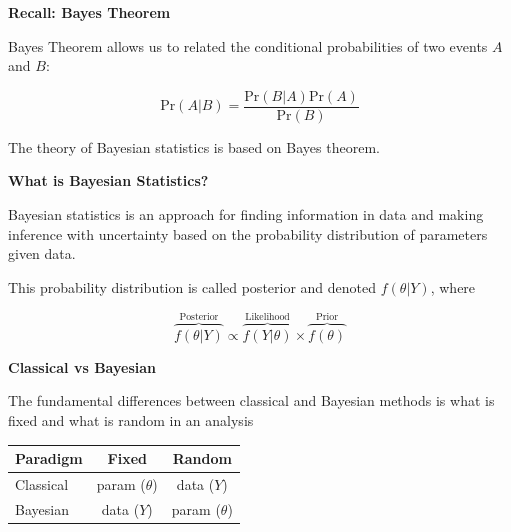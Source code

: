 \documentclass[12pt,xcolor=svgnames]{beamer}
\newcommand{\bl}{\color{blue}}
\newcommand{\theme}{\color{FireBrick}}
\newcommand{\sk}{\vspace{.4cm}}
\newcommand{\chap}[1]{{\theme \Large \bf #1} \sk}
\newcommand{\pr}{\text{Pr}}
\begin{document}

\begin{frame}
\chap{Recall: Bayes Theorem} 

Bayes Theorem allows us to related the conditional probabilities of two events $A$ and $B$:

\begin{equation*}
\pr(A|B) = \frac{\pr(B|A)\pr(A)}{\pr(B)}
\end{equation*}

The theory of Bayesian statistics is based on {\bl Bayes} theorem.

\end{frame}

\begin{frame}
\chap{What is Bayesian Statistics?} 

Bayesian statistics is an approach for finding information in data and making inference with uncertainty based on the probability distribution of parameters given data.
\sk

This probability distribution is called {\bl posterior} and denoted $f(\theta|Y)$, where

\begin{equation*}
\overbrace{f(\theta|Y)}^\text{Posterior} \propto \overbrace{f(Y|\theta)}^\text{Likelihood} \times \overbrace{f(\theta)}^\text{Prior}
\end{equation*}



\end{frame}

\begin{frame}
\chap{Classical vs Bayesian} 

The fundamental differences between classical and Bayesian methods is what is fixed and what is random in an analysis

\sk
\sk
\begin{center}
\begin{tabular}{|l|c|c|}
\hline
Paradigm & Fixed & Random \\
\hline
Classical & param ($\theta$) & data ($Y$)\\
\hline
Bayesian & data ($Y$) & param ($\theta$)\\
\hline
\end{tabular}
\end{center}
\end{frame}
\end{document}
